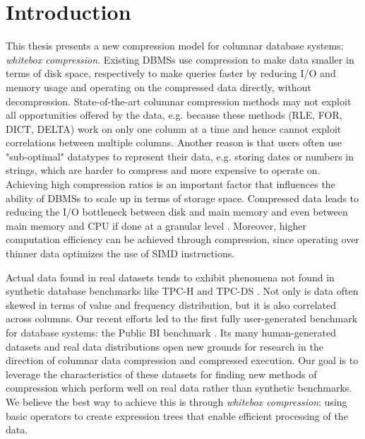 
\chapter{Introduction}


\graphicspath{{1_introduction/images/}}

%



This thesis presents a new compression model for columnar database systems: \emph{whitebox compression}. Existing DBMSs use compression to make data smaller in terms of disk space, respectively to make queries faster by reducing I/O and memory usage and operating on the compressed data directly, without decompression. State-of-the-art columnar compression methods may not exploit all opportunities offered by the data, e.g. because these methods (RLE, FOR, DICT, DELTA) work on only one column at a time and hence cannot exploit correlations between multiple columns. Another reason is that users often use "sub-optimal" datatypes to represent their data, e.g. storing dates or numbers in strings, which are harder to compress and more expensive to operate on. Achieving high compression ratios is an important factor that influences the ability of DBMSs to scale up in terms of storage space. Compressed data leads to reducing the I/O bottleneck between disk and main memory and even between main memory and CPU if done at a granular level \cite{zukowski2006super}. Moreover, higher computation efficiency can be achieved through compression, since operating over thinner data optimizes the use of SIMD instructions.

Actual data found in real datasets tends to exhibit phenomena not found in synthetic database benchmarks like TPC-H \cite{boncz2013tpc} and TPC-DS \cite{nambiar2006making}. Not only is data often skewed in terms of value and frequency distribution, but it is also correlated across columns. Our recent efforts led to the first fully user-generated benchmark for database systems: the Public BI benchmark \cite{pbib}. Its many human-generated datasets and real data distributions open new grounds for research in the direction of columnar data compression and compressed execution. Our goal is to leverage the characteristics of these datasets for finding new methods of compression which perform well on real data rather than synthetic benchmarks. We believe the best way to achieve this is through \emph{whitebox compression}: using basic operators to create expression trees that enable efficient processing of the data.

